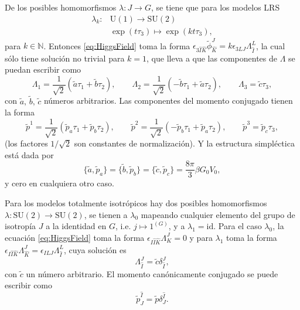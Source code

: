 De los posibles homomorfismos $\lambda: J \longrightarrow G$, se tiene que para los modelos LRS
%
\begin{align*}
\lambda_{k}: & \mathrm{U}(1) \longrightarrow \mathrm{SU}(2) \\
& \exp(t \tau_{3}) \longmapsto \exp(k t \tau_{3}),
\end{align*}
%
para $k \in \mathbb{N}$. Entonces \eqref{eq:HiggsField} toma la forma $\epsilon_{3 \hat{I} \hat{K}} \tilde{\phi}^{J}_{\hat{K}} = k \epsilon_{3LJ} \Lambda^{L}_{\hat{I}}$, la cual s\'{o}lo tiene soluci\'{o}n no trivial para $k = 1$, que lleva a que las componentes de $\Lambda$ se puedan escribir como
%
\begin{equation}
\Lambda_{1} = \frac{1}{\sqrt{2}} \left(\tilde{a} \tau_{1} + \tilde{b} \tau_{2} \right), \qquad
\Lambda_{2} = \frac{1}{\sqrt{2}} \left(-\tilde{b} \tau_{1} + \tilde{a} \tau_{2} \right), \qquad
\Lambda_{3} = \tilde{c} \tau_{3},
\end{equation}
%
con $\tilde{a}, \, \tilde{b}, \, \tilde{c}$ n\'{u}meros arbitrarios. Las componentes del momento conjugado tienen la forma
%
\begin{equation}
\tilde{p}^{1} = \frac{1}{\sqrt{2}} \left(\tilde{p}_{a} \tau_{1} + \tilde{p}_{b} \tau_{2} \right), \qquad
\tilde{p}^{2} = \frac{1}{\sqrt{2}} \left(-\tilde{p}_{b} \tau_{1} + \tilde{p}_{a} \tau_{2} \right), \qquad
\tilde{p}^{3} = \tilde{p}_{c} \tau_{3},
\end{equation}
%
(los factores $1/\sqrt{2}$ son constantes de normalizaci\'{o}n). Y la estructura simpl\'{e}ctica est\'{a} dada por
%
\begin{equation}
\{\tilde{a}, \tilde{p}_{a}\} = \{\tilde{b}, \tilde{p}_{b}\} = \{\tilde{c}, \tilde{p}_{c}\} = \frac{8 \pi}{3} \beta G_{0} V_{0},
\end{equation}
%
y cero en cualquiera otro caso.

Para los modelos totalmente isotr\'{o}picos hay dos posibles homomorfismos $\lambda: \mathrm{SU}(2) \longrightarrow \mathrm{SU}(2)$, se tienen a $\lambda_{0}$ mapeando cualquier elemento del grupo de isotrop\'{i}a $J$ a la identidad en $G$, i.e. $j \longmapsto 1^{(G)}$, y a $\lambda_{1} = \mathrm{id}$. Para el caso $\lambda_{0}$, la ecuaci\'{o}n \eqref{eq:HiggsField} toma la forma $\epsilon_{I \hat{I} \hat{K}} \Lambda^{J}_{K} = 0$ y para $\lambda_{1}$ toma la forma $\epsilon_{I \hat{I} \hat{K}} \Lambda^{J}_{\hat{K}} = \epsilon_{ILJ} \Lambda^{L}_{\hat{I}}$, cuya soluci\'{o}n es
%
\begin{equation}
\Lambda^{J}_{\hat{I}} = \tilde{c} \delta^{J}_{\hat{I}},
\end{equation}
%
con $\tilde{c}$ un n\'{u}mero arbitrario. El momento can\'{o}nicamente conjugado se puede escribir como
%
\begin{equation}
\tilde{p}^{\hat{I}}_{J} = \tilde{p} \delta^{\hat{I}}_{J}.
\end{equation}

